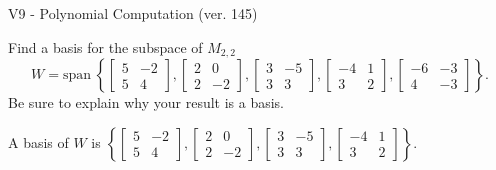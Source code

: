 \begin{exercise}
  \begin{exerciseTitle}V9 - Polynomial Computation (ver. 145)\end{exerciseTitle}
  \begin{exerciseStatement}
    Find a basis for the subspace of \(M_{2,2}\) 
\[W=\mathrm{span}\ \left\{\left[\begin{array}{cc}
5 & -2 \\
5 & 4
\end{array}\right] , \left[\begin{array}{cc}
2 & 0 \\
2 & -2
\end{array}\right] , \left[\begin{array}{cc}
3 & -5 \\
3 & 3
\end{array}\right] , \left[\begin{array}{cc}
-4 & 1 \\
3 & 2
\end{array}\right] , \left[\begin{array}{cc}
-6 & -3 \\
4 & -3
\end{array}\right]\right\}.\]
 Be sure to explain why your result is a basis.


  \end{exerciseStatement}
  \begin{exerciseAnswer}
   A basis of \(W\) is  \(\left\{\left[\begin{array}{cc}
5 & -2 \\
5 & 4
\end{array}\right] , \left[\begin{array}{cc}
2 & 0 \\
2 & -2
\end{array}\right] , \left[\begin{array}{cc}
3 & -5 \\
3 & 3
\end{array}\right] , \left[\begin{array}{cc}
-4 & 1 \\
3 & 2
\end{array}\right]\right\}\).
  


  \end{exerciseAnswer}
\end{exercise}